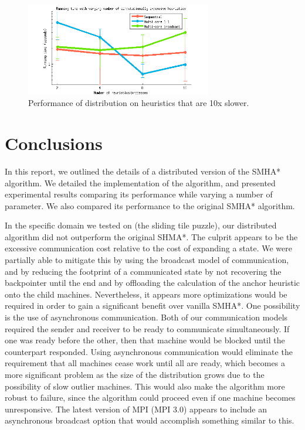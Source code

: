 \documentclass[11pt]{article}
\begin{document}
{\begin{figure}
\centering
\includegraphics[width=3.2in]{graphs/figure4}
\caption{Performance of distribution on heuristics that are 10x slower.}
\label{fig4}
\end{figure}


\section{Conclusions}


In this report, we outlined the details of a distributed version of the SMHA* algorithm. We detailed the implementation of the algorithm, and presented experimental results comparing its performance while varying a number of parameter. We also compared its performance to the original SMHA* algorithm.

In the specific domain we tested on (the sliding tile puzzle), our distributed algorithm did not outperform the original SHMA*. The culprit appears to be the excessive communication cost relative to the cost of expanding a state. We were partially able to mitigate this by using the broadcast model of communication, and by reducing the footprint of a communicated state by not recovering the backpointer until the end and by offloading the calculation of the anchor heuristic onto the child machines. Nevertheless, it appears more optimizations would be required in order to gain a significant benefit over vanilla SMHA*. One possibility is the use of asynchronous communication. Both of our communication models required the sender and receiver to be ready to communicate simultaneously. If one was ready before the other, then that machine would be blocked until the counterpart responded. Using asynchronous communication would eliminate the requirement that all machines cease work until all are ready, which becomes a more significant problem as the size of the distribution grows due to the possibility of slow outlier machines. This would also make the algorithm more robust to failure, since the algorithm could proceed even if one machine becomes unresponsive. The latest version of MPI (MPI 3.0) appears to include an asynchronous broadcast option that would accomplish something similar to this.

}
\end{document}
